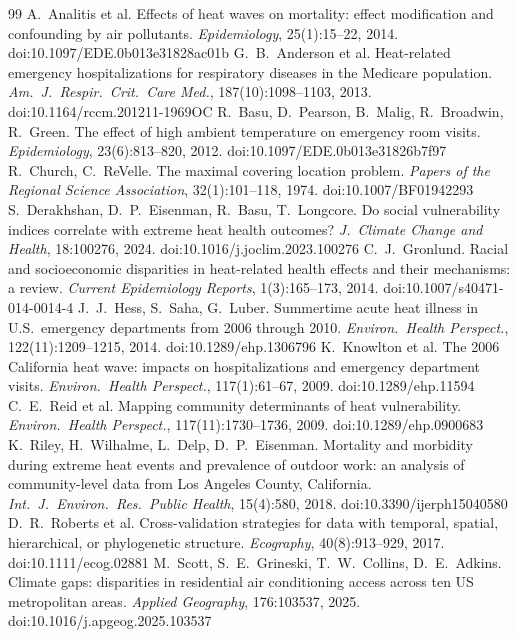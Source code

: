 \documentclass[10pt]{article}
\begin{document}
\begin{thebibliography}{99}\small
\setlength{\itemsep}{1pt}
 A.~Analitis et al. Effects of heat waves on mortality: effect modification and confounding by air pollutants. \emph{Epidemiology}, 25(1):15--22, 2014. doi:10.1097/EDE.0b013e31828ac01b
 G.~B.~Anderson et al. Heat-related emergency hospitalizations for respiratory diseases in the Medicare population. \emph{Am.\ J.\ Respir.\ Crit.\ Care Med.}, 187(10):1098--1103, 2013. doi:10.1164/rccm.201211-1969OC
 R.~Basu, D.~Pearson, B.~Malig, R.~Broadwin, R.~Green. The effect of high ambient temperature on emergency room visits. \emph{Epidemiology}, 23(6):813--820, 2012. doi:10.1097/EDE.0b013e31826b7f97
 R.~Church, C.~ReVelle. The maximal covering location problem. \emph{Papers of the Regional Science Association}, 32(1):101--118, 1974. doi:10.1007/BF01942293
 S.~Derakhshan, D.~P.~Eisenman, R.~Basu, T.~Longcore. Do social vulnerability indices correlate with extreme heat health outcomes? \emph{J.\ Climate Change and Health}, 18:100276, 2024. doi:10.1016/j.joclim.2023.100276
 C.~J.~Gronlund. Racial and socioeconomic disparities in heat-related health effects and their mechanisms: a review. \emph{Current Epidemiology Reports}, 1(3):165--173, 2014. doi:10.1007/s40471-014-0014-4
 J.~J.~Hess, S.~Saha, G.~Luber. Summertime acute heat illness in U.S.\ emergency departments from 2006 through 2010. \emph{Environ.\ Health Perspect.}, 122(11):1209--1215, 2014. doi:10.1289/ehp.1306796
 K.~Knowlton et al. The 2006 California heat wave: impacts on hospitalizations and emergency department visits. \emph{Environ.\ Health Perspect.}, 117(1):61--67, 2009. doi:10.1289/ehp.11594
 C.~E.~Reid et al. Mapping community determinants of heat vulnerability. \emph{Environ.\ Health Perspect.}, 117(11):1730--1736, 2009. doi:10.1289/ehp.0900683
 K.~Riley, H.~Wilhalme, L.~Delp, D.~P.~Eisenman. Mortality and morbidity during extreme heat events and prevalence of outdoor work: an analysis of community-level data from Los Angeles County, California. \emph{Int.\ J.\ Environ.\ Res.\ Public Health}, 15(4):580, 2018. doi:10.3390/ijerph15040580
 D.~R.~Roberts et al. Cross-validation strategies for data with temporal, spatial, hierarchical, or phylogenetic structure. \emph{Ecography}, 40(8):913--929, 2017. doi:10.1111/ecog.02881
 M.~Scott, S.~E.~Grineski, T.~W.~Collins, D.~E.~Adkins. Climate gaps: disparities in residential air conditioning access across ten US metropolitan areas. \emph{Applied Geography}, 176:103537, 2025. doi:10.1016/j.apgeog.2025.103537

\end{thebibliography}
\end{document}
